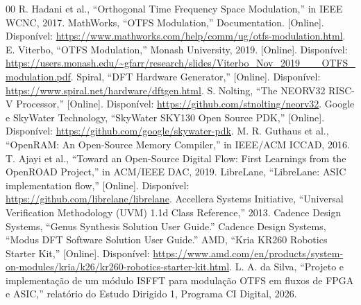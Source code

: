 \documentclass[conference]{IEEEtran}
\begin{document}
\begin{thebibliography}{00}
 R. Hadani et al., ``Orthogonal Time Frequency Space Modulation,'' in IEEE WCNC, 2017.
 MathWorks, ``OTFS Modulation,'' Documentation. [Online]. Disponível: \url{https://www.mathworks.com/help/comm/ug/otfs-modulation.html}.
 E. Viterbo, ``OTFS Modulation,'' Monash University, 2019. [Online]. Disponível: \url{https://users.monash.edu/~gfarr/research/slides/Viterbo_Nov_2019___OTFS_modulation.pdf}.
 Spiral, ``DFT Hardware Generator,'' [Online]. Disponível: \url{https://www.spiral.net/hardware/dftgen.html}.
 S. Nolting, ``The NEORV32 RISC-V Processor,'' [Online]. Disponível: \url{https://github.com/stnolting/neorv32}.
 Google e SkyWater Technology, ``SkyWater SKY130 Open Source PDK,'' [Online]. Disponível: \url{https://github.com/google/skywater-pdk}.
 M. R. Guthaus et al., ``OpenRAM: An Open-Source Memory Compiler,'' in IEEE/ACM ICCAD, 2016.
 T. Ajayi et al., ``Toward an Open-Source Digital Flow: First Learnings from the OpenROAD Project,'' in ACM/IEEE DAC, 2019.
 LibreLane, ``LibreLane: ASIC implementation flow,'' [Online]. Disponível: \url{https://github.com/librelane/librelane}.
 Accellera Systems Initiative, ``Universal Verification Methodology (UVM) 1.1d Class Reference,'' 2013.
 Cadence Design Systems, ``Genus Synthesis Solution User Guide.''
 Cadence Design Systems, ``Modus DFT Software Solution User Guide.''
 AMD, ``Kria KR260 Robotics Starter Kit,'' [Online]. Disponível: \url{https://www.amd.com/en/products/system-on-modules/kria/k26/kr260-robotics-starter-kit.html}.
 L. A. da Silva, ``Projeto e implementação de um módulo ISFFT para modulação OTFS em fluxos de FPGA e ASIC,'' relatório do Estudo Dirigido 1, Programa CI Digital, 2026.
\end{thebibliography}
\end{document}
